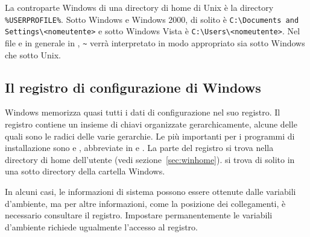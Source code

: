 \documentclass{article}
\begin{document}
La controparte Windows di una directory di home di Unix è la directory
\verb|%USERPROFILE%|. Sotto Windows  e Windows 2000, di solito
è \verb|C:\Documents and Settings\<nomeutente>| e sotto Windows Vista è
\verb|C:\Users\<nomeutente>|. Nel file  e in generale
in \KPS{}, \verb|~| verrà interpretato in modo appropriato sia sotto
Windows che sotto Unix.


\subsection{Il registro di configurazione di Windows}
\label{sec:registry}

Windows memorizza quasi tutti i dati di configurazione nel suo registro.
Il registro contiene un insieme di chiavi organizzate gerarchicamente,
alcune delle quali sono le radici delle varie gerarchie. Le più importanti
per i programmi di installazione sono  e
, abbreviate in  e . La
parte  del registro si trova nella directory di home
dell'utente (vedi sezione~\ref{sec:winhome}).  si trova di
solito in una sotto directory della cartella Windows.

In alcuni casi, le informazioni di sistema possono essere ottenute dalle
variabili d'ambiente, ma per altre informazioni, come la posizione dei
collegamenti, è necessario consultare il registro. Impostare
permanentemente le variabili d'ambiente richiede ugualmente l'accesso al
registro.
\end{document}
